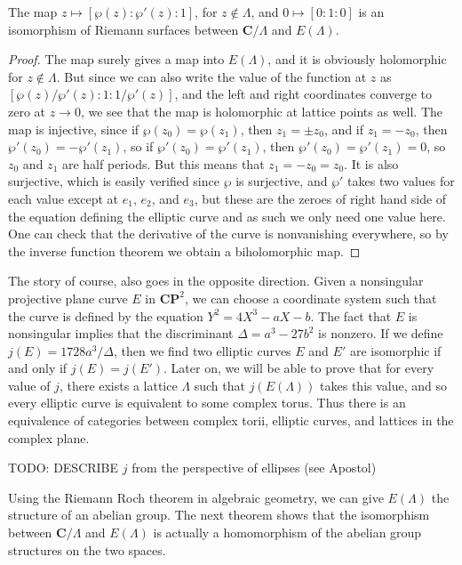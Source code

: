\begin{theorem}
    The map $z \mapsto [\wp(z): \wp'(z): 1]$, for $z \not \in \Lambda$, and $0 \mapsto [0:1:0]$ is an isomorphism of Riemann surfaces between $\mathbf{C}/\Lambda$ and $E(\Lambda)$.
\end{theorem}
\begin{proof}
    The map surely gives a map into $E(\Lambda)$, and it is obviously holomorphic for $z \not \in \Lambda$. But since we can also write the value of the function at $z$ as $[\wp(z)/\wp'(z): 1 : 1/\wp'(z)]$, and the left and right coordinates converge to zero at $z \to 0$, we see that the map is holomorphic at lattice points as well. The map is injective, since if $\wp(z_0) = \wp(z_1)$, then $z_1 = \pm z_0$, and if $z_1 = - z_0$, then $\wp'(z_0) = -\wp'(z_1)$, so if $\wp'(z_0) = \wp'(z_1)$, then $\wp'(z_0) = \wp'(z_1) = 0$, so $z_0$ and $z_1$ are half periods. But this means that $z_1 = -z_0 = z_0$. It is also surjective, which is easily verified since $\wp$ is surjective, and $\wp'$ takes two values for each value except at $e_1$, $e_2$, and $e_3$, but these are the zeroes of right hand side of the equation defining the elliptic curve and as such we only need one value here. One can check that the derivative of the curve is nonvanishing everywhere, so by the inverse function theorem we obtain a biholomorphic map.
\end{proof}

The story of course, also goes in the opposite direction. Given a nonsingular projective plane curve $E$ in $\mathbf{CP}^2$, we can choose a coordinate system such that the curve is defined by the equation $Y^2 = 4X^3 - aX - b$. The fact that $E$ is nonsingular implies that the discriminant $\Delta = a^3 - 27b^2$ is nonzero. If we define $j(E) = 1728a^3/\Delta$, then we find two elliptic curves $E$ and $E'$ are isomorphic if and only if $j(E) = j(E')$. Later on, we will be able to prove that for every value of $j$, there exists a lattice $\Lambda$ such that $j(E(\Lambda))$ takes this value, and so every elliptic curve is equivalent to some complex torus. Thus there is an equivalence of categories between complex torii, elliptic curves, and lattices in the complex plane.

TODO: DESCRIBE $j$ from the perspective of ellipses (see Apostol)

Using the Riemann Roch theorem in algebraic geometry, we can give $E(\Lambda)$ the structure of an abelian group. The next theorem shows that the isomorphism between $\mathbf{C}/\Lambda$ and $E(\Lambda)$ is actually a homomorphism of the abelian group structures on the two spaces.

